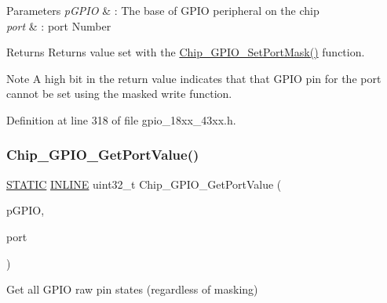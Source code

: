 \begin{DoxyParams}{Parameters}
{\em p\+G\+P\+IO} & \+: The base of G\+P\+IO peripheral on the chip \\
\hline
{\em port} & \+: port Number \\
\hline
\end{DoxyParams}
\begin{DoxyReturn}{Returns}
Returns value set with the \hyperlink{group___g_p_i_o__18_x_x__43_x_x_gaee2115e847a281cf3da40209ce6336c8}{Chip\+\_\+\+G\+P\+I\+O\+\_\+\+Set\+Port\+Mask()} function. 
\end{DoxyReturn}
\begin{DoxyNote}{Note}
A high bit in the return value indicates that that G\+P\+IO pin for the port cannot be set using the masked write function. 
\end{DoxyNote}


Definition at line 318 of file gpio\+\_\+18xx\+\_\+43xx.\+h.

\mbox{\label{group___g_p_i_o__18_x_x__43_x_x_ga14c7161208fed3f7ac4e62953353ab9b}} 
\subsubsection{\texorpdfstring{Chip\+\_\+\+G\+P\+I\+O\+\_\+\+Get\+Port\+Value()}{Chip\_GPIO\_GetPortValue()}}
{\footnotesize\ttfamily \hyperlink{group___l_p_c___types___public___macros_ga10b2d890d871e1489bb02b7e70d9bdfb}{S\+T\+A\+T\+IC} \hyperlink{spifi__18xx__43xx_8h_a2eb6f9e0395b47b8d5e3eeae4fe0c116}{I\+N\+L\+I\+NE} uint32\+\_\+t Chip\+\_\+\+G\+P\+I\+O\+\_\+\+Get\+Port\+Value (\begin{DoxyParamCaption}\item[{\hyperlink{struct_l_p_c___g_p_i_o___t}{L\+P\+C\+\_\+\+G\+P\+I\+O\+\_\+T} $\ast$}]{p\+G\+P\+IO,  }\item[{uint8\+\_\+t}]{port }\end{DoxyParamCaption})}



Get all G\+P\+IO raw pin states (regardless of masking) 


